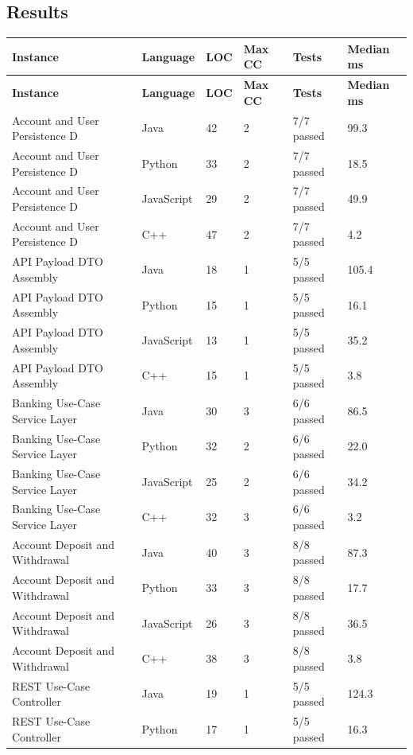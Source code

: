 \documentclass[11pt,a4paper]{article}
\begin{document}
\subsection{Results}
{\footnotesize
\begin{longtable}{@{}p{5.6cm}p{2.2cm}p{1.2cm}p{1.4cm}p{2.4cm}p{2cm}@{}}
\toprule \textbf{Instance} & \textbf{Language} & \textbf{LOC} & \textbf{Max CC} & \textbf{Tests} & \textbf{Median ms} \\ \midrule \endfirsthead
\toprule \textbf{Instance} & \textbf{Language} & \textbf{LOC} & \textbf{Max CC} & \textbf{Tests} & \textbf{Median ms} \\ \midrule \endhead
\bottomrule \endfoot
Account and User Persistence D & Java & 42 & 2 & 7/7 passed & 99.3 \\
Account and User Persistence D & Python & 33 & 2 & 7/7 passed & 18.5 \\
Account and User Persistence D & JavaScript & 29 & 2 & 7/7 passed & 49.9 \\
Account and User Persistence D & C++ & 47 & 2 & 7/7 passed & 4.2 \\
API Payload DTO Assembly & Java & 18 & 1 & 5/5 passed & 105.4 \\
API Payload DTO Assembly & Python & 15 & 1 & 5/5 passed & 16.1 \\
API Payload DTO Assembly & JavaScript & 13 & 1 & 5/5 passed & 35.2 \\
API Payload DTO Assembly & C++ & 15 & 1 & 5/5 passed & 3.8 \\
Banking Use-Case Service Layer & Java & 30 & 3 & 6/6 passed & 86.5 \\
Banking Use-Case Service Layer & Python & 32 & 2 & 6/6 passed & 22.0 \\
Banking Use-Case Service Layer & JavaScript & 25 & 2 & 6/6 passed & 34.2 \\
Banking Use-Case Service Layer & C++ & 32 & 3 & 6/6 passed & 3.2 \\
Account Deposit and Withdrawal & Java & 40 & 3 & 8/8 passed & 87.3 \\
Account Deposit and Withdrawal & Python & 33 & 3 & 8/8 passed & 17.7 \\
Account Deposit and Withdrawal & JavaScript & 26 & 3 & 8/8 passed & 36.5 \\
Account Deposit and Withdrawal & C++ & 38 & 3 & 8/8 passed & 3.8 \\
REST Use-Case Controller & Java & 19 & 1 & 5/5 passed & 124.3 \\
REST Use-Case Controller & Python & 17 & 1 & 5/5 passed & 16.3 \\

\end{longtable}}
\end{document}
